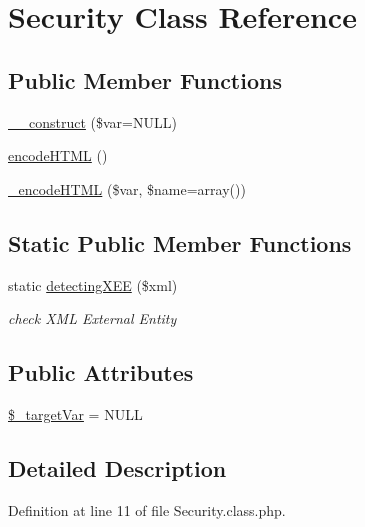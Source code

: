 \hypertarget{classSecurity}{\section{Security Class Reference}
\label{classSecurity}
}
\subsection*{Public Member Functions}
\begin{DoxyCompactItemize}
\item 
\hyperlink{classSecurity_af498b9ef2adcb7a8f45109f624f5721e}{\-\_\-\-\_\-construct} (\$var=N\-U\-L\-L)
\item 
\hyperlink{classSecurity_a55da0eb544c3f7eeb6f818578fd0b393}{encode\-H\-T\-M\-L} ()
\item 
\hyperlink{classSecurity_a70d05408553b1e5d0022272d064b5085}{\-\_\-encode\-H\-T\-M\-L} (\$var, \$name=array())
\end{DoxyCompactItemize}
\subsection*{Static Public Member Functions}
\begin{DoxyCompactItemize}
\item 
static \hyperlink{classSecurity_a6de571a78c6e950bdcaf2e61583418a0}{detecting\-X\-E\-E} (\$xml)
\begin{DoxyCompactList}\small\item\em check X\-M\-L External Entity \end{DoxyCompactList}\end{DoxyCompactItemize}
\subsection*{Public Attributes}
\begin{DoxyCompactItemize}
\item 
\hyperlink{classSecurity_a28ff37b08bd7a592552cf5af13f7ac74}{\$\-\_\-target\-Var} = N\-U\-L\-L
\end{DoxyCompactItemize}


\subsection{Detailed Description}


Definition at line 11 of file Security.\-class.\-php.




